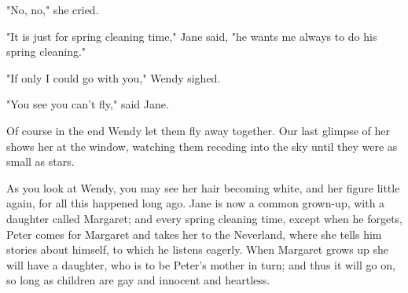 "No, no," she cried.

"It is just for spring cleaning time," Jane said,
"he wants me always to do his spring cleaning."

"If only I could go with you," Wendy sighed.

"You see you can't fly," said Jane.

Of course in the end Wendy let them fly away together.
Our last glimpse of her shows her at the window,
watching them receding into the sky until they were as small as stars.

As you look at Wendy,
you may see her hair becoming white,
and her figure little again,
for all this happened long ago.
Jane is now a common grown-up,
with a daughter called Margaret;
and every spring cleaning time,
except when he forgets,
Peter comes for Margaret and takes her to the Neverland,
where she tells him stories about himself,
to which he listens eagerly.
When Margaret grows up she will have a daughter,
who is to be Peter’s mother in turn;
and thus it will go on,
so long as children are gay and innocent and heartless.

\endinput

